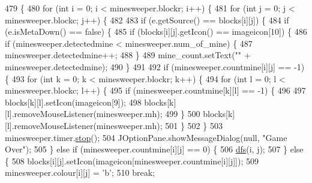 \begin{DoxyCode}
479                                          \{
480         \textcolor{keywordflow}{for} (\textcolor{keywordtype}{int} i = 0; i < minesweeper.blockr; i++) \{
481             \textcolor{keywordflow}{for} (\textcolor{keywordtype}{int} j = 0; j < minesweeper.blockc; j++) \{
482  
483                 \textcolor{keywordflow}{if} (e.getSource() == blocks[i][j]) \{
484                     \textcolor{keywordflow}{if} (e.isMetaDown() == \textcolor{keyword}{false}) \{
485                         \textcolor{keywordflow}{if} (blocks[i][j].getIcon() == imageicon[10]) \{
486                             \textcolor{keywordflow}{if} (minesweeper.detectedmine < minesweeper.num\_of\_mine) \{
487                                 minesweeper.detectedmine++;
488                             \}
489                             mine\_count.setText(\textcolor{stringliteral}{""} + minesweeper.detectedmine);
490                         \}
491  
492                         \textcolor{keywordflow}{if} (minesweeper.countmine[i][j] == -1) \{
493                             \textcolor{keywordflow}{for} (\textcolor{keywordtype}{int} k = 0; k < minesweeper.blockr; k++) \{
494                                 \textcolor{keywordflow}{for} (\textcolor{keywordtype}{int} l = 0; l < minesweeper.blockc; l++) \{
495                                     \textcolor{keywordflow}{if} (minesweeper.countmine[k][l] == -1) \{
496  
497                                         blocks[k][l].setIcon(imageicon[9]);
498                                         blocks[k][l].removeMouseListener(minesweeper.mh);
499                                     \}
500                                     blocks[k][l].removeMouseListener(minesweeper.mh);
501                                 \}
502                             \}
503                             minesweeper.timer.\hyperlink{classhufs_1_1cse_1_1khk_1_1_timer_a5ab9e7bd1e1b1f74604887cd99b27972}{stop}();
504                             JOptionPane.showMessageDialog(null, \textcolor{stringliteral}{"Game Over"});
505                         \} \textcolor{keywordflow}{else} \textcolor{keywordflow}{if} (minesweeper.countmine[i][j] == 0) \{
506                             \hyperlink{classhufs_1_1cse_1_1khk_1_1_minesweeper_u_i_ac9d8adecf10f5e6f203fc979fe032963}{dfs}(i, j);
507                         \} \textcolor{keywordflow}{else} \{
508                             blocks[i][j].setIcon(imageicon[minesweeper.countmine[i][j]]);
509                             minesweeper.colour[i][j] = \textcolor{charliteral}{'b'};
510                             \textcolor{keywordflow}{break};

\end{DoxyCode}
